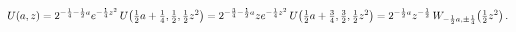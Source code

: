 \[\mathop{U\/}\nolimits\!\left(a,z\right)=2^{-\frac{1}{4}-\frac{1}{2}a}e^{-\frac%
{1}{4}z^{2}}\mathop{U\/}\nolimits\!\left(\tfrac{1}{2}a+\tfrac{1}{4},\tfrac{1}{%
2},\tfrac{1}{2}z^{2}\right)=2^{-\frac{3}{4}-\frac{1}{2}a}ze^{-\frac{1}{4}z^{2}%
}\mathop{U\/}\nolimits\!\left(\tfrac{1}{2}a+\tfrac{3}{4},\tfrac{3}{2},\tfrac{1%
}{2}z^{2}\right)=2^{-\frac{1}{2}a}z^{-\frac{1}{2}}\mathop{W_{-\frac{1}{2}a,\pm%
\frac{1}{4}}\/}\nolimits\!\left(\tfrac{1}{2}z^{2}\right).\]